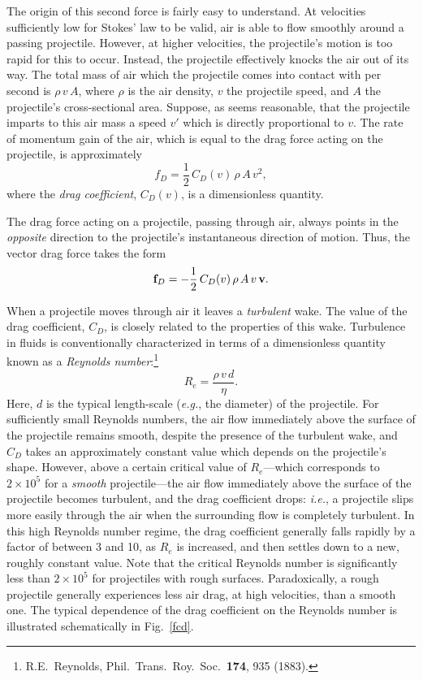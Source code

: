 The origin of this second force is fairly easy to understand. At velocities
sufficiently low for Stokes' law to be valid,
 air is able to flow smoothly around a passing projectile.
However, at higher velocities,
the projectile's motion is too rapid for this to occur. Instead, the projectile 
effectively knocks the air out of its way. The total mass of air which the projectile comes into contact with per
second is $\rho\,v\,A$, where $\rho$ is the air density, $v$  the
projectile speed, and $A$ the projectile's cross-sectional area. 
 Suppose, as seems reasonable,
that the projectile imparts to this air mass a speed $v'$ which is directly
proportional to $v$. The rate of momentum gain of the air, which is equal
to the drag force acting on the projectile, is approximately
\begin{equation}
f_D =  \frac{1}{2}\,C_D(v)\,\rho\,A\,v^2,
\end{equation}
where the {\em drag coefficient}, $C_D(v)$, is a dimensionless quantity.

The  drag force acting on a projectile, passing through air, always points in the {\em opposite}\/ 
direction to the projectile's instantaneous direction of motion. Thus, the vector
drag force takes the form
\begin{equation}
{\bf f}_D = -\frac{1}{2}\,C_D(v)\,\rho\,A\,v\,{\bf v}.\label{e1.8}
\end{equation}

When a projectile moves through air it leaves a {\em turbulent}\/ wake. The value of the
drag coefficient, $C_D$, is closely related to the properties of this wake. Turbulence
in fluids is conventionally characterized in terms of a dimensionless quantity known
as a {\em Reynolds number}:\footnote{R.E.~Reynolds, Phil.\ Trans.\ Roy.\ Soc.\ {\bf 174}, 935 (1883).}
\begin{equation}
R_e = \frac{\rho\,v\,d}{\eta}.
\end{equation}
Here, $d$ is the typical length-scale  ({\em e.g.}, the diameter) of the projectile. For sufficiently small Reynolds
numbers, the air flow immediately above the surface of the projectile remains smooth,
despite the presence of the turbulent wake,
and $C_D$ takes an approximately constant value which depends on the projectile's
shape. However, above
a certain critical value of $R_e$---which corresponds to $2\times 10^5$ for
a {\em smooth}\/ projectile---the air flow immediately above the surface of the projectile
becomes turbulent, and the drag coefficient drops: {\em i.e.}, a projectile
slips more easily through the air when the surrounding flow is completely
turbulent. In this high Reynolds number regime, the drag coefficient generally falls
rapidly by a factor of between 3 and 10, as $R_e$ is increased, and then settles
down to a new, roughly constant value. Note that
the critical Reynolds number is significantly less than $2\times 10^5$ for
projectiles with rough surfaces. Paradoxically, a rough projectile generally experiences
less air drag, at high velocities, than a smooth one. The typical dependence of the
drag coefficient on the Reynolds number is illustrated schematically in Fig.~\ref{fcd}.

